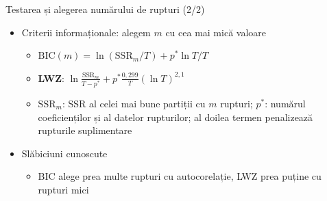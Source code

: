 \begin{frame}{Testarea și alegerea numărului de rupturi (2/2)}
\itemsize{\small}
\begin{itemize}
    \item Criterii informaționale: alegem $m$ cu cea mai mică valoare
    \begin{itemize}
        \item $\mathrm{BIC}(m) = \ln(\mathrm{SSR}_m/T) + p^*\ln T/T$
        \item \textbf{LWZ}: $\ln\frac{\mathrm{SSR}_m}{T - p^*} + p^*\frac{0{,}299}{T}(\ln T)^{2{,}1}$ 
        \item $\mathrm{SSR}_m$: SSR al celei mai bune partiții cu $m$ rupturi; $p^*$: numărul coeficienților și al datelor rupturilor; al doilea termen penalizează rupturile suplimentare
    \end{itemize}
    \item Slăbiciuni cunoscute
    \begin{itemize}
        \item BIC alege prea multe rupturi cu autocorelație, LWZ prea puține cu rupturi mici
    \end{itemize}
\end{itemize}
\end{frame}

